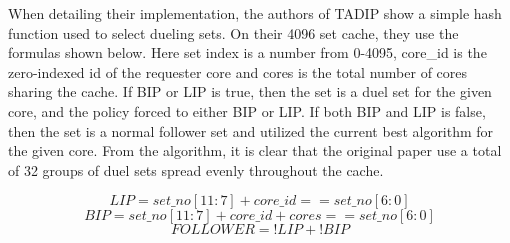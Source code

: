 When detailing their implementation, the authors of TADIP show a simple hash function used to select dueling sets.
On their 4096 set cache, they use the formulas shown below.
Here set index is a number from 0-4095, core\_id is the zero-indexed id of the requester core and cores is the total number of cores sharing the cache.
If BIP or LIP is true, then the set is a duel set for the given core, and the policy forced to either BIP or LIP.
If both BIP and LIP is false, then the set is a normal follower set and utilized the current best algorithm for the given core.
From the algorithm, it is clear that the original paper use a total of 32 groups of duel sets spread evenly throughout the cache.
\begin{figure*}[ht]
\begin{equation}
LIP = set\_no[11:7] + core\_id == set\_no[6:0]
\end{equation}
\begin{equation}
BIP = set\_no[11:7] + core\_id + cores == set\_no[6:0]
\end{equation}
\begin{equation}
FOLLOWER = !LIP + !BIP
\end{equation}
\end{figure*}

